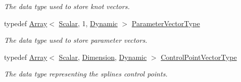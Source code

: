 \begin{DoxyCompactItemize}
\begin{DoxyCompactList}\small\item\em The data type used to store knot vectors. \end{DoxyCompactList}\item 
\mbox{\label{group___splines___module_a61cd43163c3fe6c68cc6c191d210a36f}} 
typedef \hyperlink{group___core___module_class_eigen_1_1_array}{Array}$<$ \hyperlink{group___splines___module_aa440dee6a559821c867c94ee4bbf60f3}{Scalar}, 1, \hyperlink{namespace_eigen_ad81fa7195215a0ce30017dfac309f0b2}{Dynamic} $>$ \hyperlink{group___splines___module_a61cd43163c3fe6c68cc6c191d210a36f}{Parameter\+Vector\+Type}
\begin{DoxyCompactList}\small\item\em The data type used to store parameter vectors. \end{DoxyCompactList}\item 
\mbox{\label{group___splines___module_ad4a21460926a6186f3b56cec9380e742}} 
typedef \hyperlink{group___core___module_class_eigen_1_1_array}{Array}$<$ \hyperlink{group___splines___module_aa440dee6a559821c867c94ee4bbf60f3}{Scalar}, \hyperlink{group___splines___module_a93e7c03e3ea8088794fd8207404c94d7adbafbfda2651866a881829e1aa7c918c}{Dimension}, \hyperlink{namespace_eigen_ad81fa7195215a0ce30017dfac309f0b2}{Dynamic} $>$ \hyperlink{group___splines___module_ad4a21460926a6186f3b56cec9380e742}{Control\+Point\+Vector\+Type}
\begin{DoxyCompactList}\small\item\em The data type representing the spline\textquotesingle{}s control points. \end{DoxyCompactList}\end{DoxyCompactItemize}


